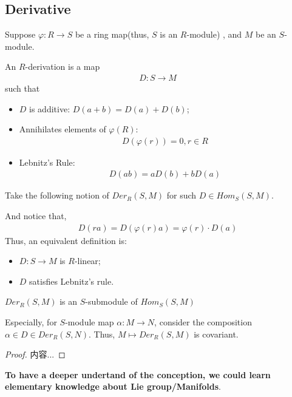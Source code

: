 \documentclass[Total.tex]{subfiles}
\begin{document}
		\subsection{Derivative}
		\begin{Def}
			Suppose $\varphi:R\rightarrow S$ be a ring map(thus, $S$ is an $R$-module) , and $M$ be an $S$-module.
			
			An $R$-derivation is a map
			\begin{gather*}
				D:S\rightarrow M
			\end{gather*}
			such that
			\begin{itemize}
				\item $D$ is additive: $D(a+b)=D(a)+D(b)$;
				\item Annihilates elements of $\varphi(R)$:
				\begin{gather*}
					D(\varphi(r))=0,r\in R
				\end{gather*}
				\item Lebnitz's Rule:
				\begin{gather*}
					D(ab)=aD(b)+bD(a)
				\end{gather*}
			\end{itemize}
			Take the following notion of $Der_R(S,M)$ for such $D\in Hom_S(S,M)$.
		\end{Def}
		And notice that,
		\begin{gather*}
			D(ra)=D(\varphi(r)a)=\varphi(r)\cdot D(a)
		\end{gather*}
		Thus, an equivalent definition is:
		\begin{itemize}
			\item $D:S\rightarrow M$ is $R$-linear;
			\item $D$ satisfies Lebnitz's rule.
		\end{itemize}
		\begin{lemma}
			$Der_R(S,M)$ is an $S$-submodule of $Hom_S(S,M)$
			
			Especially, for $S$-module map $\alpha:M\rightarrow N$, consider the composition $\alpha\in D\in Der_R(S,N)$. Thus, $M\mapsto Der_R(S,M)$ is covariant.
		\end{lemma}
		\begin{proof}
			内容...
		\end{proof}
		
		\textbf{To have a deeper undertand of the conception, we could learn elementary knowledge about Lie group/Manifolds}.
\end{document}

